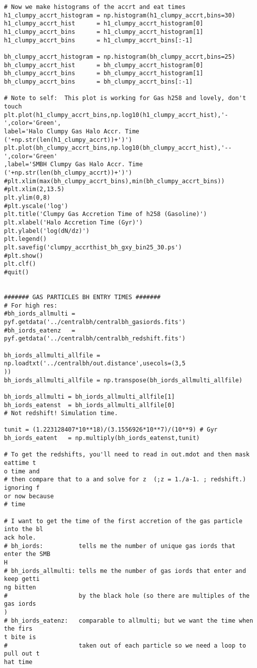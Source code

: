 \documentclass[12pt,headA,chapB]{fiskthesis}
\begin{document}
\begin{verbatim}
# Now we make histograms of the accrt and eat times
h1_clumpy_accrt_histogram = np.histogram(h1_clumpy_accrt,bins=30)
h1_clumpy_accrt_hist      = h1_clumpy_accrt_histogram[0]
h1_clumpy_accrt_bins      = h1_clumpy_accrt_histogram[1]
h1_clumpy_accrt_bins      = h1_clumpy_accrt_bins[:-1]

bh_clumpy_accrt_histogram = np.histogram(bh_clumpy_accrt,bins=25)
bh_clumpy_accrt_hist      = bh_clumpy_accrt_histogram[0]
bh_clumpy_accrt_bins      = bh_clumpy_accrt_histogram[1]
bh_clumpy_accrt_bins      = bh_clumpy_accrt_bins[:-1]

# Note to self:  This plot is working for Gas h258 and lovely, don't touch
plt.plot(h1_clumpy_accrt_bins,np.log10(h1_clumpy_accrt_hist),'-',color='Green',
label='Halo Clumpy Gas Halo Accr. Time ('+np.str(len(h1_clumpy_accrt))+')')
plt.plot(bh_clumpy_accrt_bins,np.log10(bh_clumpy_accrt_hist),'--',color='Green'
,label='SMBH Clumpy Gas Halo Accr. Time ('+np.str(len(bh_clumpy_accrt))+')')
#plt.xlim(max(bh_clumpy_accrt_bins),min(bh_clumpy_accrt_bins))
#plt.xlim(2,13.5)
plt.ylim(0,8)
#plt.yscale('log')
plt.title('Clumpy Gas Accretion Time of h258 (Gasoline)')
plt.xlabel('Halo Accretion Time (Gyr)')
plt.ylabel('log(dN/dz)')
plt.legend()
plt.savefig('clumpy_accrthist_bh_gxy_bin25_30.ps')
#plt.show()
plt.clf()
#quit()


####### GAS PARTICLES BH ENTRY TIMES #######
# For high res:
#bh_iords_allmulti = pyf.getdata('../centralbh/centralbh_gasiords.fits')
#bh_iords_eatenz   = pyf.getdata('../centralbh/centralbh_redshift.fits')

bh_iords_allmulti_allfile = np.loadtxt('../centralbh/out.distance',usecols=(3,5
))
bh_iords_allmulti_allfile = np.transpose(bh_iords_allmulti_allfile)

bh_iords_allmulti = bh_iords_allmulti_allfile[1]
bh_iords_eatenst  = bh_iords_allmulti_allfile[0]
# Not redshift! Simulation time.

tunit = (1.223128407*10**18)/(3.1556926*10**7)/(10**9) # Gyr
bh_iords_eatent   = np.multiply(bh_iords_eatenst,tunit)   

# To get the redshifts, you'll need to read in out.mdot and then mask eattime t
o time and
# then compare that to a and solve for z  (;z = 1./a-1. ; redshift.) ignoring f
or now because
# time

# I want to get the time of the first accretion of the gas particle into the bl
ack hole. 
# bh_iords:          tells me the number of unique gas iords that enter the SMB
H
# bh_iords_allmulti: tells me the number of gas iords that enter and keep getti
ng bitten
#                    by the black hole (so there are multiples of the gas iords
) 
# bh_iords_eatenz:   comparable to allmulti; but we want the time when the firs
t bite is 
#                    taken out of each particle so we need a loop to pull out t
hat time


\end{verbatim}
\end{document}
